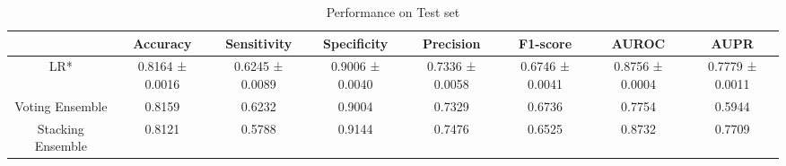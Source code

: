 \begin{table}[h!]
    \centering
    \caption{Performance on Test set}
    \begin{adjustbox}{width=\textwidth}
    \begin{tabular}{|c|c|c|c|c|c|c|c|}
    \hline
      & Accuracy & Sensitivity & Specificity & Precision & F1-score & AUROC & AUPR \\
    \hline
    LR* & 0.8164 ± 0.0016 & 0.6245 ± 0.0089 & 0.9006 ± 0.0040 & 0.7336 ± 0.0058 & 0.6746 ± 0.0041 & 0.8756 ± 0.0004 & 0.7779 ± 0.0011 \\
    \hline
    Voting Ensemble & 0.8159 & 0.6232 & 0.9004 & 0.7329 & 0.6736 & 0.7754 & 0.5944 \\
    \hline
    Stacking Ensemble & 0.8121 & 0.5788 & 0.9144 & 0.7476 & 0.6525 & 0.8732 & 0.7709 \\
    \hline
    \end{tabular}
    \end{adjustbox}
    \end{table}
    